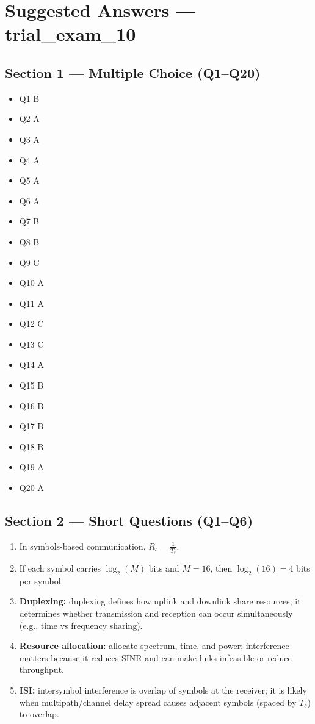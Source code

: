 \documentclass[11pt,a4paper]{article}
\begin{document}
\section*{Suggested Answers --- trial\_exam\_10}

\subsection*{Section 1 --- Multiple Choice (Q1--Q20)}
\begin{itemize}
    \item Q1 B
    \item Q2 A
    \item Q3 A
    \item Q4 A
    \item Q5 A
    \item Q6 A
    \item Q7 B
    \item Q8 B
    \item Q9 C
    \item Q10 A
    \item Q11 A
    \item Q12 C
    \item Q13 C
    \item Q14 A
    \item Q15 B
    \item Q16 B
    \item Q17 B
    \item Q18 B
    \item Q19 A
    \item Q20 A
\end{itemize}

\subsection*{Section 2 --- Short Questions (Q1--Q6)}
\begin{enumerate}[label=\arabic*.]
    \item In symbols-based communication, $R_s=\frac{1}{T_s}$.
    \item If each symbol carries $\log_2(M)$ bits and $M=16$, then $\log_2(16)=4$ bits per symbol.
    \item \textbf{Duplexing:} duplexing defines how uplink and downlink share resources; it determines whether transmission and reception can occur simultaneously (e.g., time vs frequency sharing).
    \item \textbf{Resource allocation:} allocate spectrum, time, and power; interference matters because it reduces SINR and can make links infeasible or reduce throughput.
    \item \textbf{ISI:} intersymbol interference is overlap of symbols at the receiver; it is likely when multipath/channel delay spread causes adjacent symbols (spaced by $T_s$) to overlap.
    
\end{enumerate}
\end{document}
